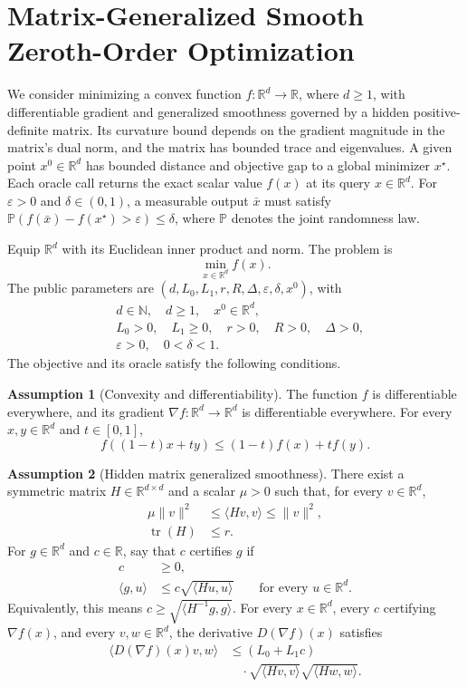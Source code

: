 \documentclass[10pt]{article}
\theoremstyle{definition}
\newtheorem{assumption}{Assumption}
\begin{document}
\section*{Matrix-Generalized Smooth Zeroth-Order Optimization}
We consider minimizing a convex function $f:\mathbb{R}^d\to\mathbb{R}$, where $d\geq1$, with differentiable gradient and generalized smoothness governed by a hidden positive-definite matrix. Its curvature bound depends on the gradient magnitude in the matrix's dual norm, and the matrix has bounded trace and eigenvalues. A given point $x^0\in\mathbb{R}^d$ has bounded distance and objective gap to a global minimizer $x^\star$. Each oracle call returns the exact scalar value $f(x)$ at its query $x\in\mathbb{R}^d$. For $\varepsilon>0$ and $\delta\in(0,1)$, a measurable output $\bar{x}$ must satisfy $\mathbb{P}(f(\bar{x})-f(x^\star)>\varepsilon)\leq\delta$, where $\mathbb{P}$ denotes the joint randomness law.

Equip $\mathbb{R}^d$ with its Euclidean inner product and norm. The problem is
\[
\min_{x\in\mathbb{R}^d} f(x).
\]
The public parameters are $(d,L_0,L_1,r,R,\Delta,\varepsilon,\delta,x^0)$, with
\[
\begin{aligned}
&d\in\mathbb{N},\quad d\geq1,\quad x^0\in\mathbb{R}^d,\\
&L_0>0,\quad L_1\geq0,\quad r>0,\quad R>0,\quad \Delta>0,\\
&\varepsilon>0,\quad 0<\delta<1.
\end{aligned}
\]
The objective and its oracle satisfy the following conditions.

\begin{assumption}[Convexity and differentiability]
The function $f$ is differentiable everywhere, and its gradient $\nabla f:\mathbb{R}^d\to\mathbb{R}^d$ is differentiable everywhere. For every $x,y\in\mathbb{R}^d$ and $t\in[0,1]$,
\[
f((1-t)x+ty)\leq(1-t)f(x)+tf(y).
\]
\end{assumption}

\begin{assumption}[Hidden matrix generalized smoothness]
There exist a symmetric matrix $H\in\mathbb{R}^{d\times d}$ and a scalar $\mu>0$ such that, for every $v\in\mathbb{R}^d$,
\[
\begin{aligned}
\mu\|v\|^2&\leq\langle Hv,v\rangle\leq\|v\|^2,\\
\operatorname{tr}(H)&\leq r.
\end{aligned}
\]
For $g\in\mathbb{R}^d$ and $c\in\mathbb{R}$, say that $c$ certifies $g$ if
\[
\begin{aligned}
c&\geq0,\\
\langle g,u\rangle&\leq c\sqrt{\langle Hu,u\rangle}
\qquad\text{for every }u\in\mathbb{R}^d.
\end{aligned}
\]
Equivalently, this means $c\geq\sqrt{\langle H^{-1}g,g\rangle}$. For every $x\in\mathbb{R}^d$, every $c$ certifying $\nabla f(x)$, and every $v,w\in\mathbb{R}^d$, the derivative $D(\nabla f)(x)$ satisfies
\[
\begin{aligned}
\langle D(\nabla f)(x)v,w\rangle
&\leq (L_0+L_1c)\\
&\quad\cdot\sqrt{\langle Hv,v\rangle}\sqrt{\langle Hw,w\rangle}.
\end{aligned}
\]
\end{assumption}
\end{document}
